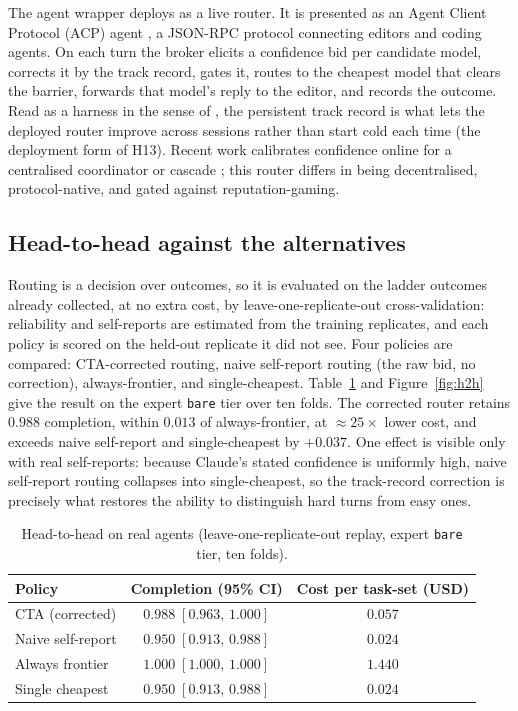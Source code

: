 \documentclass[11pt]{article}
\newcommand{\code}[1]{\texttt{#1}}
\begin{document}
The agent wrapper deploys as a live router. It is presented as an Agent Client Protocol (ACP) agent \citep{acp2025}, a JSON-RPC protocol connecting editors and coding agents. On each turn the broker elicits a confidence bid per candidate model, corrects it by the track record, gates it, routes to the cheapest model that clears the barrier, forwards that model's reply to the editor, and records the outcome. Read as a harness in the sense of \citet{weng2026harness}, the persistent track record is what lets the deployed router improve across sessions rather than start cold each time (the deployment form of H13). Recent work calibrates confidence online for a centralised coordinator or cascade \citep{armstrong2026margin,kotte2026ucci}; this router differs in being decentralised, protocol-native, and gated against reputation-gaming.

\subsection{Head-to-head against the alternatives}
Routing is a decision over outcomes, so it is evaluated on the ladder outcomes already collected, at no extra cost, by leave-one-replicate-out cross-validation: reliability and self-reports are estimated from the training replicates, and each policy is scored on the held-out replicate it did not see. Four policies are compared: CTA-corrected routing, naive self-report routing (the raw bid, no correction), always-frontier, and single-cheapest. Table~\ref{tab:h2h} and Figure~\ref{fig:h2h} give the result on the expert \code{bare} tier over ten folds. The corrected router retains $0.988$ completion, within $0.013$ of always-frontier, at $\approx 25\times$ lower cost, and exceeds naive self-report and single-cheapest by $+0.037$. One effect is visible only with real self-reports: because Claude's stated confidence is uniformly high, naive self-report routing collapses into single-cheapest, so the track-record correction is precisely what restores the ability to distinguish hard turns from easy ones.

\begin{table}[t]
\centering\small
\caption{Head-to-head on real agents (leave-one-replicate-out replay, expert \code{bare} tier, ten folds).}
\label{tab:h2h}
\begin{tabular}{@{}lcc@{}}
\toprule
\textbf{Policy} & \textbf{Completion (95\% CI)} & \textbf{Cost per task-set (USD)} \\
\midrule
CTA (corrected) & $0.988\;[0.963,\,1.000]$ & $0.057$ \\
Naive self-report & $0.950\;[0.913,\,0.988]$ & $0.024$ \\
Always frontier & $1.000\;[1.000,\,1.000]$ & $1.440$ \\
Single cheapest & $0.950\;[0.913,\,0.988]$ & $0.024$ \\
\bottomrule
\end{tabular}
\end{table}
\end{document}
